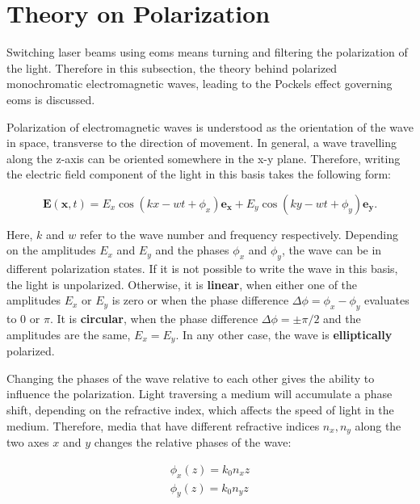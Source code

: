 \section{Theory on Polarization}%
\label{sec:pol}

Switching laser beams using \acp{eom} means turning and filtering the polarization of the light. Therefore in this subsection, the theory behind polarized monochromatic electromagnetic waves, leading to the Pockels effect governing \acp{eom} is discussed.

Polarization of electromagnetic waves is understood as the orientation of the wave in space, transverse to the direction of movement. In general, a wave travelling along the z-axis can be oriented somewhere in the x-y plane. Therefore, writing the electric field component of the light in this basis takes the following form:

\begin{equation}
	\mathbf{E}(\mathbf{x}, t) = E_x \cos\left(kx - wt + \phi_x\right) \mathbf{e_x} + E_y \cos\left(ky - wt + \phi_y\right) \mathbf{e_y}.
\end{equation}

Here, $k$ and $w$ refer to the wave number and frequency respectively.
Depending on the amplitudes $E_x$ and $E_y$ and the phases $\phi_x$ and $\phi_y$, the wave can be in different polarization states. If it is not possible to write the wave in this basis, the light is unpolarized. Otherwise, it is \textbf{linear}, when either one of the amplitudes $E_x$ or $E_y$ is zero or when the phase difference $\Delta \phi = \phi_x - \phi_y$ evaluates to 0 or $\pi$. It is \textbf{circular}, when the phase difference $\Delta \phi = \pm \pi/2$ and the amplitudes are the same, $E_x = E_y$. In any other case, the wave is \textbf{elliptically} polarized.

Changing the phases of the wave relative to each other gives the ability to influence the polarization. Light traversing a medium will accumulate a phase shift, depending on the refractive index, which affects the speed of light in the medium. Therefore, media that have different refractive indices $n_x, n_y$ along the two axes $x$ and $y$ changes the relative phases of the wave:

\begin{align}
	\label{eq:pol,phases}
	\phi_x(z) = k_0 n_x z \\
	\phi_y(z) = k_0 n_y z
\end{align}

